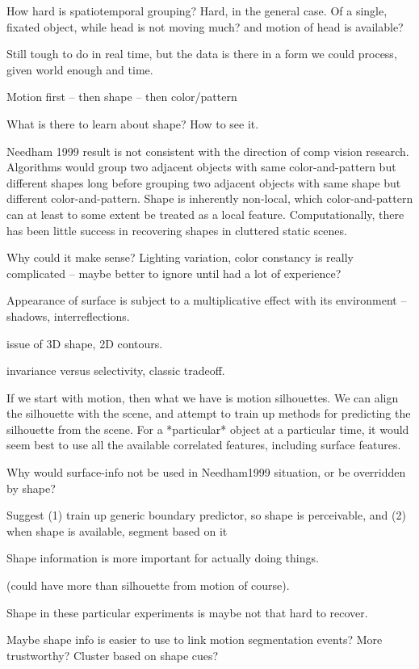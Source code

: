 How hard is spatiotemporal grouping?
Hard, in the general case.
Of a single, fixated object, while head is not moving much?  and
motion of head is available?

Still tough to do in real time, but the data is there in a form
we could process, given world enough and time.


Motion first -- then shape -- then color/pattern

What is there to learn about shape?  How to see it.

Needham 1999 result is not consistent with the direction of comp
vision research.  Algorithms would group two adjacent objects with
same color-and-pattern but different shapes long before grouping two
adjacent objects with same shape but different color-and-pattern.
Shape is inherently non-local, which color-and-pattern 
can at least to some extent be treated as a local feature.
Computationally, there 
has been little success in recovering shapes in cluttered static scenes.

Why could it make sense?  Lighting variation, color constancy is
really complicated -- maybe better to ignore until had a lot
of experience?

Appearance of surface is subject to a multiplicative effect
with its environment -- shadows, interreflections.

issue of 3D shape, 2D contours.

invariance versus selectivity, classic tradeoff.

If we start with motion, then what we have is motion silhouettes.
We can align the silhouette with the scene, and attempt to train
up methods for predicting the silhouette from the scene.
For a *particular* object at a particular time, it would seem 
best to use all the available correlated features, including 
surface features.  

Why would surface-info not be used in Needham1999 situation,
or be overridden by shape?

Suggest (1) train up generic boundary predictor, so
shape is perceivable, and (2) when shape is available,
segment based on it

Shape information is more important for actually doing things.

(could have more than silhouette from motion of course).


Shape in these particular experiments is maybe not that hard to
recover.

Maybe shape info is easier to use to link motion segmentation
events?  More trustworthy?  Cluster based on shape cues?

